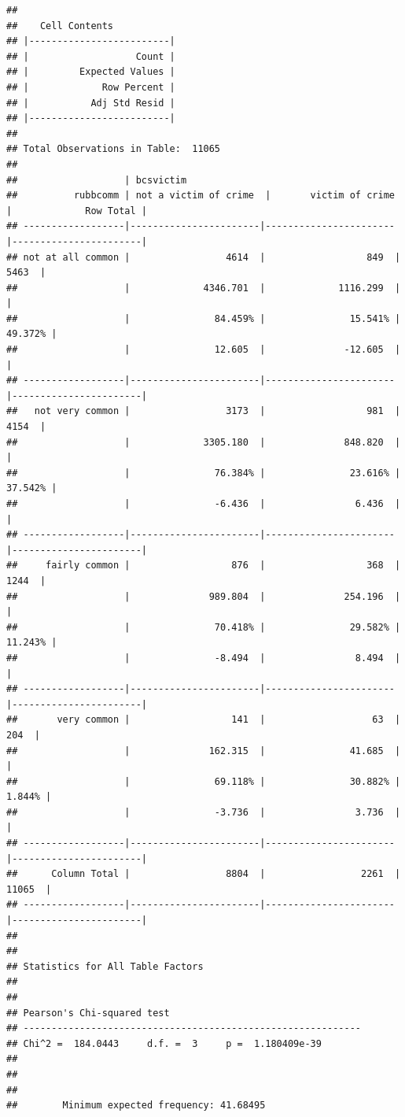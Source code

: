 \documentclass[]{book}
\theoremstyle{definition}
\theoremstyle{definition}
\theoremstyle{definition}
\theoremstyle{remark}
\begin{document}
\begin{verbatim}
## 
##    Cell Contents
## |-------------------------|
## |                   Count |
## |         Expected Values |
## |             Row Percent |
## |           Adj Std Resid |
## |-------------------------|
## 
## Total Observations in Table:  11065 
## 
##                   | bcsvictim 
##          rubbcomm | not a victim of crime  |       victim of crime  |             Row Total | 
## ------------------|-----------------------|-----------------------|-----------------------|
## not at all common |                 4614  |                  849  |                 5463  | 
##                   |             4346.701  |             1116.299  |                       | 
##                   |               84.459% |               15.541% |               49.372% | 
##                   |               12.605  |              -12.605  |                       | 
## ------------------|-----------------------|-----------------------|-----------------------|
##   not very common |                 3173  |                  981  |                 4154  | 
##                   |             3305.180  |              848.820  |                       | 
##                   |               76.384% |               23.616% |               37.542% | 
##                   |               -6.436  |                6.436  |                       | 
## ------------------|-----------------------|-----------------------|-----------------------|
##     fairly common |                  876  |                  368  |                 1244  | 
##                   |              989.804  |              254.196  |                       | 
##                   |               70.418% |               29.582% |               11.243% | 
##                   |               -8.494  |                8.494  |                       | 
## ------------------|-----------------------|-----------------------|-----------------------|
##       very common |                  141  |                   63  |                  204  | 
##                   |              162.315  |               41.685  |                       | 
##                   |               69.118% |               30.882% |                1.844% | 
##                   |               -3.736  |                3.736  |                       | 
## ------------------|-----------------------|-----------------------|-----------------------|
##      Column Total |                 8804  |                 2261  |                11065  | 
## ------------------|-----------------------|-----------------------|-----------------------|
## 
##  
## Statistics for All Table Factors
## 
## 
## Pearson's Chi-squared test 
## ------------------------------------------------------------
## Chi^2 =  184.0443     d.f. =  3     p =  1.180409e-39 
## 
## 
##  
##        Minimum expected frequency: 41.68495
\end{verbatim}
\end{document}
